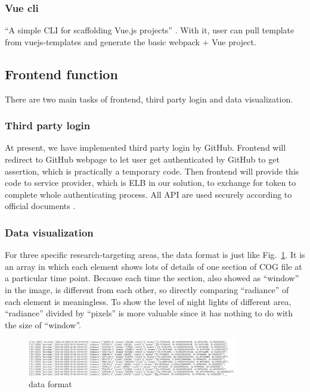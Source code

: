 \documentclass[conference]{IEEEtran}
\begin{document}
\subsubsection{Vue cli}

“A simple CLI for scaffolding Vue.js projects” \cite{Introduc89:online}. With it, user can pull
template from vuejs-templates and generate the basic webpack + Vue project.

\subsection{Frontend function}

There are two main tasks of frontend, third party login and data visualization.

\subsubsection{Third party login}

At present, we have implemented third party login by GitHub. Frontend will redirect to GitHub webpage to let user get authenticated 
by GitHub to get assertion, which is practically a temporary code. Then frontend will provide this code to service provider, which 
is ELB in our solution, to exchange for token to complete whole authenticating process. All API are used securely according to official 
documents \cite{Authoriz26:online}.

\subsubsection{Data visualization}

For three specific research-targeting areas, the data format is just like Fig.~\ref{dffg}. It is an array in which 
each element shows lots of details of one section of COG file at a particular time point. Because each time the section, also showed 
as “window” in the image, is different from each other, so directly comparing “radiance” of each element is meaningless. To show the 
level of night lights of different area, “radiance” divided by “pixels” is more valuable since it has nothing to do with the size of 
“window”.

\begin{figure}[htbp]
    \centerline{\includegraphics[width=260pt]{images/Data_format_frontend_get.png}}
    \caption{data format}
    \label{dffg}
\end{figure}
 
\end{document}
